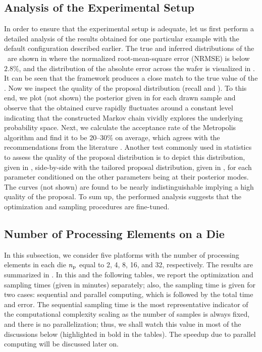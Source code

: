 \subsection{Analysis of the Experimental Setup}

In order to ensure that the experimental setup is adequate, let us first perform a detailed analysis of the results obtained for one particular example with the default configuration described earlier.
The true and inferred distributions of the \qoi\ are shown in  where the normalized root-mean-square error (NRMSE) is below $2.8\%$, and the distribution of the absolute error across the wafer is visualized in . It can be seen that the framework produces a close match to the true value of the \qoi.
Now we inspect the quality of the proposal distribution (recall  and ). To this end, we plot (not shown) the posterior given in  for each drawn sample and observe that the obtained curve rapidly fluctuates around a constant level indicating that the constructed Markov chain vividly explores the underlying probability space.
Next, we calculate the acceptance rate of the Metropolis algorithm and find it to be $20$--$30\%$ on average, which agrees with the recommendations from the literature \cite{gelman2004}.
Another test commonly used in statistics to assess the quality of the proposal distribution is to depict this distribution, given in , side-by-side with the tailored proposal distribution, given in , for each parameter conditioned on the other parameters being at their posterior modes.
The curves (not shown) are found to be nearly indistinguishable implying a high quality of the proposal. To sum up, the performed analysis suggests that the optimization and sampling procedures are fine-tuned.

\subsection{Number of Processing Elements on a Die}
In this subsection, we consider five platforms with the number of processing elements in each die ${n_\text{p}}$ equal to 2, 4, 8, 16, and 32, respectively. The results are summarized in .
In this and the following tables, we report the optimization and sampling times (given in minutes) separately; also, the sampling time is given for two cases: sequential and parallel computing, which is followed by the total time and error.
The sequential sampling time is the most representative indicator of the computational complexity scaling as the number of samples is always fixed, and there is no parallelization; thus, we shall watch this value in most of the discussions below (highlighted in bold in the tables). The speedup due to parallel computing will be discussed later on.


